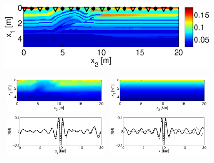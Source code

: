 \documentclass{iopart}
\begin{document}
{\begin{figure}
\centering
\includegraphics[scale=.7]{./figs/2D_overthrust1_a}\\
\begin{tabular}{cc}
\includegraphics[scale=.3]{./figs/2D_overthrust1_f}&
\includegraphics[scale=.3]{./figs/2D_overthrust2_f}\\
\includegraphics[scale=.3]{./figs/2D_overthrust1_k}&
\includegraphics[scale=.3]{./figs/2D_overthrust2_k}\\

\end{tabular}
\end{figure}}
\end{document}
